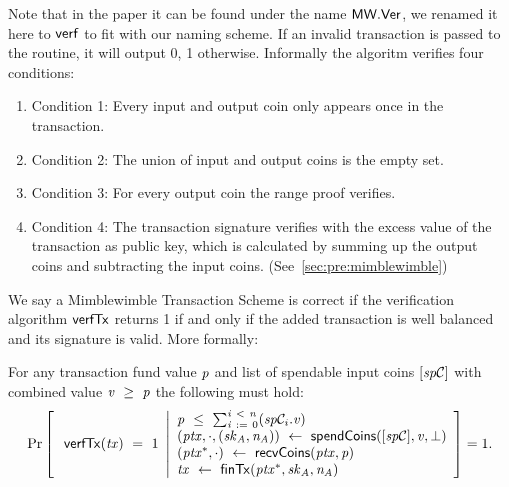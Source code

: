 \begin{definition}
\begin{itemize}
        Note that in the paper it can be found under the name $\mathsf{MW.Ver}$, we renamed it here to $\mathsf{verf}$ to fit with our naming scheme.
        If an invalid transaction is passed to the routine, it will output 0, 1 otherwise.
        Informally the algoritm verifies four conditions:
        \begin{enumerate}
            \item Condition 1: Every input and output coin only appears once in the transaction.
            \item Condition 2: The union of input and output coins is the empty set.
            \item Condition 3: For every output coin the range proof verifies.
            \item Condition 4: The transaction signature verifies with the excess value of the transaction as public key, which is calculated by summing up the output coins and subtracting the input coins. (See~\cref{sec:pre:mimblewimble})
        \end{enumerate}
    \end{itemize}
\end{definition}

We say a Mimblewimble Transaction Scheme is correct if the verification algorithm $\mathsf{verfTx}$ returns 1 if and only if the added transaction is well balanced and its signature is valid.
More formally:
\begin{definition}
    \label{def:atom:tx-scheme-correctness}
    For any transaction fund value $\mathit{p}$ and list of spendable input coins $[\mathit{sp}\mathcal{C}]$ with combined value $\mathit{v} ~\geq~ \mathit{p}$ the following must hold:
    \[
        \Pr\left[
        \begin{array}{c}
            \: \mathsf{verfTx}(\mathit{tx}) ~=~ 1
        \end{array}
        \middle\vert
        \begin{array}{l}
            \mathit{p} ~\leq~ \sum_{\mathit{i} ~:=~ 0}^{\mathit{i} ~<~ \mathit{n}}(\mathit{sp}\mathcal{C}_{i}.\mathit{v}) \\
            (\mathit{ptx}, \cdot, (\mathit{sk}_{\mathit{A}}, \mathit{\mathit{n}_{\mathit{A}}})) ~\leftarrow~ \mathsf{spendCoins}([\mathit{sp}\mathcal{C}],\mathit{v},\bot) \\
            (\mathit{ptx}^*, \cdot) ~\leftarrow~ \mathsf{recvCoins}(\mathit{ptx},\mathit{p}) \\
            \mathit{tx} ~\leftarrow~ \mathsf{finTx}(\mathit{ptx}^*,\mathit{sk}_{\mathit{A}},\mathit{\mathit{n}_{\mathit{A}}})
        \end{array}
        \right]=1.
    \]
\end{definition}

